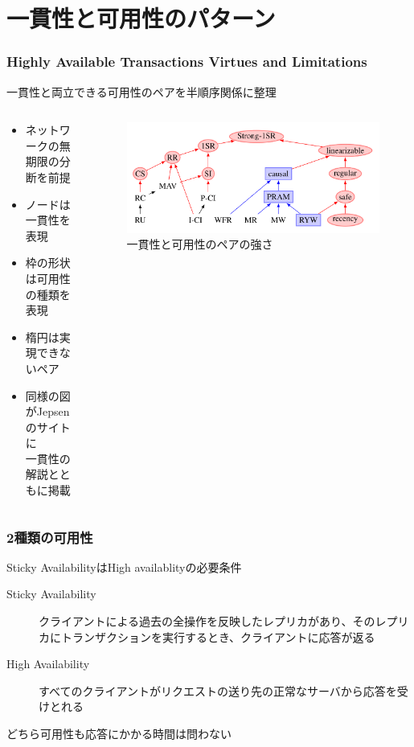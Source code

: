 \documentclass[unicode, 14pt, aspectratio=169]{beamer}
\begin{document}
\section{一貫性と可用性のパターン}
\begin{frame}
  \frametitle{\normalsize{Highly Available Transactions Virtues and Limitations\supercite{high}}}
  {\large 一貫性と両立できる可用性のペアを半順序関係に整理}
  \begin{columns}
    \begin{column}{0.5\textwidth}
      \begin{itemize}
      \item {\small ネットワークの無期限の分断を前提}
      \item {\small ノードは一貫性を表現}
      \item {\small 枠の形状は可用性の種類を表現}
      \item {\small 楕円は実現できないペア}        
      \item {\small 同様の図がJepsenのサイトに\\一貫性の解説とともに掲載\supercite{jepsen-models}}
      \end{itemize}
    \end{column}    
    \begin{column}{0.5\textwidth}
      \begin{figure}
        \includegraphics[width=1\textwidth]{images/hat.png}
        \caption{一貫性と可用性のペアの強さ\supercite{high}}
      \end{figure}
    \end{column} 
  \end{columns}
\end{frame}
\begin{frame}
  \frametitle{2種類の可用性}
  {\large Sticky AvailabilityはHigh availablityの必要条件}
  \begin{description}
  \item[Sticky Availability] クライアントによる過去の全操作を反映したレプリカがあり、そのレプリカにトランザクションを実行するとき、クライアントに応答が返る
  \item[High Availability] すべてのクライアントがリクエストの送り先の正常なサーバから応答を受けとれる
  \end{description}
  どちら可用性も応答にかかる時間は問わない
\end{frame}
\end{document}
